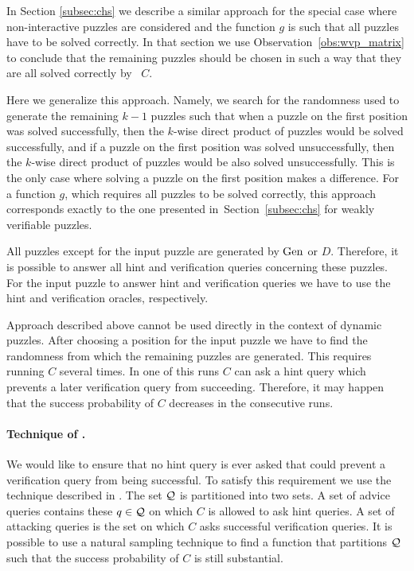 In Section \ref{subsec:chs} we describe a similar approach for the special case where
non-interactive puzzles are considered and the function $g$ is such that all puzzles have to be solved correctly.
In that section we use Observation~\ref{obs:wvp_matrix} to conclude that the remaining puzzles should be chosen in such a way that they
are all solved correctly by~ $C$.

Here we generalize this approach. Namely, we search for the randomness used to generate the remaining $k\!-\!1$ puzzles
such that when a puzzle on the first position was solved successfully, then the $k$-wise direct product of puzzles would be solved successfully,
and if a puzzle on the first position was solved unsuccessfully, then the $k$-wise direct product of puzzles would be also solved unsuccessfully.
This is the only case where solving a puzzle on the first position makes a difference.
For a function $g$, which requires all puzzles to be solved correctly, this approach corresponds
exactly to the one presented in~Section~\ref{subsec:chs} for weakly verifiable puzzles.

All puzzles except for the input puzzle are generated by $\operatorname{\text{Gen}}$ or $D$.
Therefore, it is possible to answer all hint and verification queries concerning these puzzles.
For the input puzzle to answer hint and verification queries we have to use the hint and verification oracles, respectively.

Approach described above cannot be used directly in the context of dynamic puzzles.
After choosing a position for the input puzzle we have to find the randomness from which the remaining puzzles are generated.
This requires running $C$ several times. In one of this runs $C$ can ask a hint query which prevents a later verification query from succeeding.
Therefore, it may happen that the success probability of $C$ decreases in the consecutive runs.

\paragraph{Technique of \cite{dodis2009security}.}
We would like to ensure that no hint query is ever asked that could prevent a verification query from being successful.
To satisfy this requirement we use the technique described in \cite{dodis2009security}.
The set $\mathcal{Q}$ is partitioned into two sets. A set of advice queries contains these $q \in \mathcal{Q}$ on which
$C$ is allowed to ask hint queries. A set of attacking queries is the set on which $C$ asks successful verification queries.
It is possible to use a natural sampling technique to find a function that partitions $\mathcal{Q}$ such that
the success probability of $C$ is still substantial.

